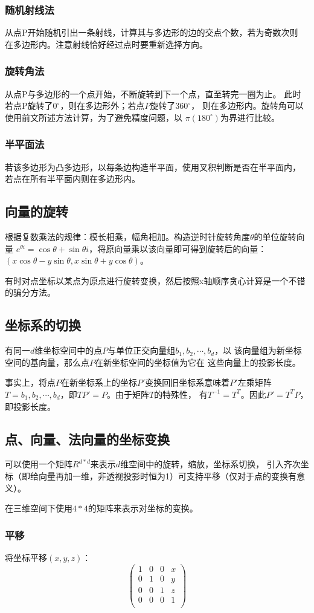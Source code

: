 \subsubsection{随机射线法}
从点P开始随机引出一条射线，计算其与多边形的边的交点个数，若为奇数次则
在多边形内。注意射线恰好经过点时要重新选择方向。
\subsubsection{旋转角法}
从点P与多边形的一个点开始，不断旋转到下一个点，直至转完一圈为止。
此时若点P旋转了$0^\circ$，则在多边形外；若点$P$旋转了$360^\circ$，
则在多边形内。旋转角可以使用前文所述方法计算，为了避免精度问题，以
$\pi(180^\circ)$为界进行比较。
\subsubsection{半平面法}
若该多边形为凸多边形，以每条边构造半平面，使用叉积判断是否在半平面内，
若点在所有半平面内则在多边形内。
\subsection{向量的旋转}
根据复数乘法的规律：模长相乘，幅角相加。构造逆时针旋转角度$\theta$的单位旋转向量
$e^{\theta i}=\cos \theta+\sin \theta i$，将原向量乘以该向量即可得到旋转后的向量：
$(x\cos \theta-y\sin \theta,x\sin \theta+y\cos \theta)$。

有时对点坐标以某点为原点进行旋转变换，然后按照x轴顺序贪心计算是一个不错的骗分方法。
\subsection{坐标系的切换}
有同一$d$维坐标空间中的点$P$与单位正交向量组$b_1,b_2,\cdots,b_d$，以
该向量组为新坐标空间的基向量，那么点$P$在新坐标空间的坐标值为它在
这些向量上的投影长度。

事实上，将点$P$在新坐标系上的坐标$P'$变换回旧坐标系意味着$P'$左乘矩阵
$T={b_1,b_2,\cdots,b_d}$，即$TP'=P$。由于矩阵$T$的特殊性，
有$T^{-1}=T^T$。因此$P'=T^TP$，即投影长度。
\subsection{点、向量、法向量的坐标变换}
可以使用一个矩阵$R^{d*d}$来表示$d$维空间中的旋转，缩放，坐标系切换，
引入齐次坐标（即给向量再加一维，非透视投影时恒为1）可支持平移（仅对于点的变换有意义）。

在三维空间下使用$4*4$的矩阵来表示对坐标的变换。

\subsubsection{平移}
将坐标平移$(x,y,z)$：
\begin{displaymath}
	\left(\begin{array}{cccc}
		1 & 0 & 0 & x \\
		0 & 1 & 0 & y \\
		0 & 0 & 1 & z \\
		0 & 0 & 0 & 1 \\
	\end{array}\right)
\end{displaymath}
